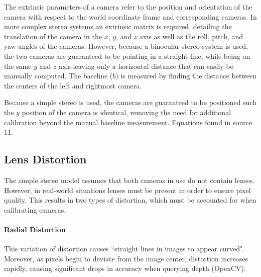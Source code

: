 \documentclass[11pt]{scrartcl}
\begin{document}
The extrinsic parameters of a camera refer to the position and orientation of the camera 
with respect to the world coordinate frame and corresponding cameras. In more complex 
stereo systems an extrinsic matrix is required, detailing the translation of the camera 
in the $x$, $y$, and $z$ axis as well as the roll, pitch, and yaw angles of the cameras. 
However, because a binocular stereo system is used, the two cameras are guaranteed to 
be pointing in a straight line, while being on the same $y$ and $z$ axis leaving only 
a horizontal distance that can easily be manually computed. The baseline ($b$) is measured 
by finding the distance between the centers of the left and rightmost camera. 

\begin{remark}
    Because a simple stereo is used, the cameras are guaranteed to be positioned such the $y$ position of the camera is identical, removing the need for additional calibration beyond the manual baseline measurement. Equations found in source 11. 
\end{remark}

\subsection{Lens Distortion}
The simple stereo model assumes that both cameras in use do not contain lenses. However, in real-world situations lenses must be present in order to ensure pixel quality. This results in two types of distortion, which must be accounted for when calibrating cameras.  
\paragraph{Radial Distortion}
    This variation of distortion causes ``straight lines in images to appear curved". Moreover, as pixels begin to deviate from the image center, distortion increases rapidly, causing significant drops in accuracy when querying depth (OpenCV). 
\end{document}
